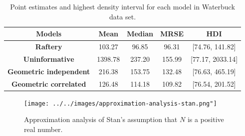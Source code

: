 \begin{table}[!ht]
    \centering
    \begin{tabular}{|c|c|c|c|c|}
        \hline
        {\bf Models} &     {\bf Mean} &  {\bf Median} &    {\bf MRSE} &    {\bf HDI} \\\hline
        {\bf Raftery} &   103.27 &   96.85 &   96.31 &   [74.76, 141.82] \\\hline
        {\bf Uninformative} &  1398.78 &  237.20 &  155.99 &  [77.17, 2033.14] \\\hline
        {\bf Geometric independent} &   216.38 &  153.75 &  132.48 &   [76.63, 465.19] \\\hline
        {\bf Geometric correlated} &   126.48 &  114.18 &  109.82 &   [76.54, 201.52] \\\hline
    \end{tabular}
    \caption{Point estimates and highest density interval for each model in Waterbuck data set.}
    \label{tab:summary-statistics-posterior-waterbuck}      
\end{table}


\begin{figure}[!hb]
    \centering
    \texttt{[image: ../../images/approximation-analysis-stan.png"]}
    \caption{Approximation analysis of Stan's assumption that $N$ is a positive real number. }
    \label{fig:approximation-stan}
\end{figure}

\vspace{1cm}